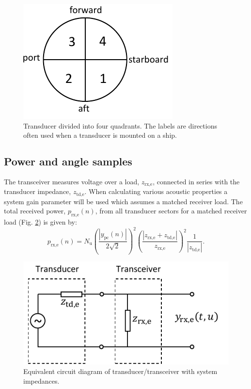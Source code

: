 \documentclass[preprint,12pt,TurnOnLineNumbers]{JASAnew}
\newcommand{\samplesymt}{n}
\newcommand{\nchannels}{N_{\textrm{u}}}
\newcommand{\zrxe}{z_{\textrm{rx,e}}}
\newcommand{\ztde}{z_{\textrm{td,e}}}
\newcommand{\prxe}{p_{\textrm{rx,e}}}
\newcommand{\ypc}{y_{\textrm{pc}}}
\begin{document}
\begin{figure}
\includegraphics{Fig_trd_quad}
\caption{\label{fi:trd_quad}Transducer divided into four quadrants. The labels are directions often used when a transducer is mounted on a ship.}
\end{figure}
%


\subsection{Power and angle samples}
The transceiver measures voltage over a load, $\zrxe$, connected in series with the transducer impedance, $\ztde$. When calculating various acoustic properties a system gain parameter will be used which assumes a matched receiver load. The total received power, $\prxe(\samplesymt)$, from all transducer sectors for a matched receiver load (Fig. \ref{fi:impedances}) is given by: 
\begin{equation}
\label{eq:prx}
\prxe(\samplesymt) = \nchannels\left( \frac{|\ypc(\samplesymt)|}{2\sqrt{2}} \right)^2 \left( \frac{|\zrxe+\ztde|}{\zrxe} \right)^2 \frac{1}{|\ztde|}.
\end{equation}
%
\begin{figure}
\includegraphics[width=16cm]{Fig_impedances}
\caption{\label{fi:impedances}Equivalent circuit diagram of transducer/transceiver with system impedances.}
\end{figure}
\end{document}

